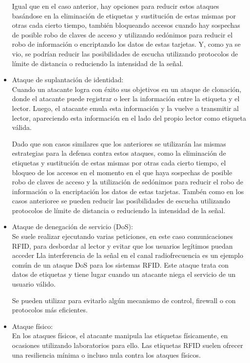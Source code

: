 \documentclass[12pt,a4paper,onecolumn,oneside]{report}
\begin{document}
\begin{itemize}
Igual que en el caso anterior, hay opciones para reducir estos ataques basándose en la eliminación de etiquetas y sustitución de estas mismas por otras cada cierto tiempo, también bloqueando accesos cuando hay sospechas de posible robo de claves de acceso y utilizando sedónimos para reducir el robo de información o encriptando los datos de estas tarjetas. Y, como ya se vio, se podrían reducir las posibilidades de escucha utilizando protocolos de límite de distancia o reduciendo la intensidad de la señal.

\item Ataque de suplantación de identidad:\\
Cuando un atacante logra con éxito sus objetivos en un ataque de clonación, donde el atacante puede registrar o leer la información entre la etiqueta y el lector. Luego, el atacante emula esta información y la vuelve a transmitir al lector, apareciendo esta información en el lado del propio lector como etiqueta válida.

Dado que son casos similares que los anteriores se utilizarán las mismas estrategias para la defensa contra estos ataques, como la eliminación de etiquetas y sustitución de estas mismas por otras cada cierto tiempo, el bloqueo de los accesos en el momento en el que haya sospechas de posible robo de claves de acceso y la utilización de sedónimos para reducir el robo de información o la encriptación los datos de estas tarjetas. Tambén como en los casos anterioree se pueden reducir las posibilidades de escucha utilizando protocolos de límite de distancia o reduciendo la intensidad de la señal.

\item Ataque de denegación de servicio (DoS):\\
Se suele realizar ejecutando varias peticiones, en este caso comunicaciones RFID, para desbordar al lector y evitar que los usuarios legítimos puedan acceder Lla interferencia de la señal en el canal radiofrecuencia es un ejemplo común de un ataque DoS para los sistemas RFID. Este ataque trata con datos de etiquetas y tiene lugar cuando un atacante niega el servicio de un usuario válido.

Se pueden utilizar para evitarlo algún mecanismo de control, firewall o con protocolos más eficientes.

\item Ataque físico:\\
En los ataques físicos, el atacante manipula las etiquetas físicamente, en ocasiones utilizando laboratorios para ello. Las etiquetas RFID suelen ofrecer una resiliencia mínima o incluso nula contra los ataques físicos. 


\end{itemize}
\end{document}
